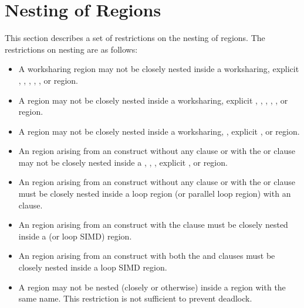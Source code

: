 {{{{\section{Nesting of Regions}
\label{sec:Nesting of Regions}
This section describes a set of restrictions on the nesting of regions. The restrictions on 
nesting are as follows:

\begin{itemize}
\item A worksharing region may not be closely nested inside a worksharing, explicit , ,
, , , or  region.

\item A  region may not be closely nested inside a worksharing, explicit , ,
, , , or  region.

\item A  region may not be closely nested inside a worksharing, ,  
explicit , or  region.

\item An  region arising from an  construct without
any clause or with the  or  clause may not be closely
nested inside a , , , explicit ,
or  region. 

\item An  region arising from an  construct without
any clause or with the  or  clause must be closely nested
inside a loop region (or parallel loop region) with an  clause.

\item An  region arising from an  construct with the
 clause must be closely nested inside a  (or loop SIMD)
region.

\item An  region arising from an  construct with
  both the  and  clauses must be closely nested inside
  a loop SIMD region.

\item A  region may not be nested (closely or otherwise) inside a  
region with the same name. This restriction is not sufficient to prevent 
deadlock.


\end{itemize}}}}}
